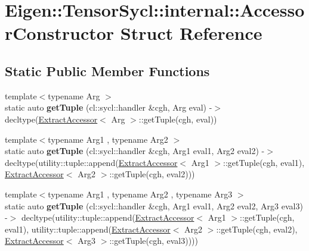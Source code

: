 \hypertarget{struct_eigen_1_1_tensor_sycl_1_1internal_1_1_accessor_constructor}{}\section{Eigen\+:\+:Tensor\+Sycl\+:\+:internal\+:\+:Accessor\+Constructor Struct Reference}
\label{struct_eigen_1_1_tensor_sycl_1_1internal_1_1_accessor_constructor}
\subsection*{Static Public Member Functions}
\begin{DoxyCompactItemize}
\item 
\mbox{\label{struct_eigen_1_1_tensor_sycl_1_1internal_1_1_accessor_constructor_a7afcb4b214e2371f61cdeb81eda14e5a}} 
{\footnotesize template$<$typename Arg $>$ }\\static auto {\bfseries get\+Tuple} (cl\+::sycl\+::handler \&cgh, Arg eval) -\/$>$ decltype(\hyperlink{struct_eigen_1_1_tensor_sycl_1_1internal_1_1_extract_accessor}{Extract\+Accessor}$<$ Arg $>$\+::get\+Tuple(cgh, eval))
\item 
\mbox{\label{struct_eigen_1_1_tensor_sycl_1_1internal_1_1_accessor_constructor_a143c5607532668fb8ad51139ef814af2}} 
{\footnotesize template$<$typename Arg1 , typename Arg2 $>$ }\\static auto {\bfseries get\+Tuple} (cl\+::sycl\+::handler \&cgh, Arg1 eval1, Arg2 eval2) -\/$>$ decltype(utility\+::tuple\+::append(\hyperlink{struct_eigen_1_1_tensor_sycl_1_1internal_1_1_extract_accessor}{Extract\+Accessor}$<$ Arg1 $>$\+::get\+Tuple(cgh, eval1), \hyperlink{struct_eigen_1_1_tensor_sycl_1_1internal_1_1_extract_accessor}{Extract\+Accessor}$<$ Arg2 $>$\+::get\+Tuple(cgh, eval2)))
\item 
\mbox{\label{struct_eigen_1_1_tensor_sycl_1_1internal_1_1_accessor_constructor_ad3fdd38122365383400b4ac68fb9c8ee}} 
{\footnotesize template$<$typename Arg1 , typename Arg2 , typename Arg3 $>$ }\\static auto {\bfseries get\+Tuple} (cl\+::sycl\+::handler \&cgh, Arg1 eval1, Arg2 eval2, Arg3 eval3) -\/$>$ decltype(utility\+::tuple\+::append(\hyperlink{struct_eigen_1_1_tensor_sycl_1_1internal_1_1_extract_accessor}{Extract\+Accessor}$<$ Arg1 $>$\+::get\+Tuple(cgh, eval1), utility\+::tuple\+::append(\hyperlink{struct_eigen_1_1_tensor_sycl_1_1internal_1_1_extract_accessor}{Extract\+Accessor}$<$ Arg2 $>$\+::get\+Tuple(cgh, eval2), \hyperlink{struct_eigen_1_1_tensor_sycl_1_1internal_1_1_extract_accessor}{Extract\+Accessor}$<$ Arg3 $>$\+::get\+Tuple(cgh, eval3))))

\end{DoxyCompactItemize}
